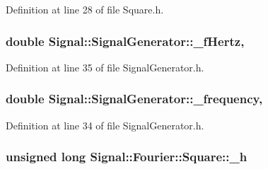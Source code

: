 Definition at line 28 of file Square.\+h.

\hypertarget{classSignal_1_1SignalGenerator_a85a4702347352bab1c71e0a8df8437d6}{
\subsubsection[{\+\_\+f\+Hertz}]{\setlength{\rightskip}{0pt plus 5cm}double Signal\+::\+Signal\+Generator\+::\+\_\+f\+Hertz\hspace{0.3cm}{\ttfamily [protected]}, {\ttfamily [inherited]}}}\label{classSignal_1_1SignalGenerator_a85a4702347352bab1c71e0a8df8437d6}


Definition at line 35 of file Signal\+Generator.\+h.

\hypertarget{classSignal_1_1SignalGenerator_a7f107461333bce68c5dad412db96a8c2}{
\subsubsection[{\+\_\+frequency}]{\setlength{\rightskip}{0pt plus 5cm}double Signal\+::\+Signal\+Generator\+::\+\_\+frequency\hspace{0.3cm}{\ttfamily [protected]}, {\ttfamily [inherited]}}}\label{classSignal_1_1SignalGenerator_a7f107461333bce68c5dad412db96a8c2}


Definition at line 34 of file Signal\+Generator.\+h.

\hypertarget{classSignal_1_1Fourier_1_1Square_a289e48f696976033845c704970e4de80}{
\subsubsection[{\+\_\+h}]{\setlength{\rightskip}{0pt plus 5cm}unsigned long Signal\+::\+Fourier\+::\+Square\+::\+\_\+h\hspace{0.3cm}{\ttfamily [protected]}}}\label{classSignal_1_1Fourier_1_1Square_a289e48f696976033845c704970e4de80}


